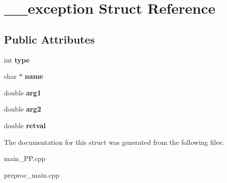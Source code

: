 \hypertarget{struct____exception}{\section{\+\_\+\+\_\+exception Struct Reference}
\label{struct____exception}
}
\subsection*{Public Attributes}
\begin{DoxyCompactItemize}
\item 
\hypertarget{struct____exception_acfffb4a0e7adc0d24a1d754cfc12fec6}{int {\bfseries type}}\label{struct____exception_acfffb4a0e7adc0d24a1d754cfc12fec6}

\item 
\hypertarget{struct____exception_a67d5f15e0e55cf44f40f568d922e33f6}{char $\ast$ {\bfseries name}}\label{struct____exception_a67d5f15e0e55cf44f40f568d922e33f6}

\item 
\hypertarget{struct____exception_a974cf6e463d735accdfb3f7f2b0abb27}{double {\bfseries arg1}}\label{struct____exception_a974cf6e463d735accdfb3f7f2b0abb27}

\item 
\hypertarget{struct____exception_a5715ed5c3d26dd039cf46604481609d5}{double {\bfseries arg2}}\label{struct____exception_a5715ed5c3d26dd039cf46604481609d5}

\item 
\hypertarget{struct____exception_a541a8bc2c4e65dfe0155bd33119f0fa0}{double {\bfseries retval}}\label{struct____exception_a541a8bc2c4e65dfe0155bd33119f0fa0}

\end{DoxyCompactItemize}


The documentation for this struct was generated from the following files\+:\begin{DoxyCompactItemize}
\item 
main\+\_\+\+P\+P.\+cpp\item 
preproc\+\_\+main.\+cpp\end{DoxyCompactItemize}
